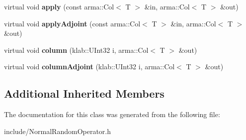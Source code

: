 \begin{DoxyCompactItemize}
\item 
virtual void {\bfseries apply} (const arma\+::\+Col$<$ T $>$ \&in, arma\+::\+Col$<$ T $>$ \&out)\hypertarget{classkl1p_1_1TNormalRandomOperator_ab66a9c633fc086840586c4dbb5121c8e}{}\label{classkl1p_1_1TNormalRandomOperator_ab66a9c633fc086840586c4dbb5121c8e}

\item 
virtual void {\bfseries apply\+Adjoint} (const arma\+::\+Col$<$ T $>$ \&in, arma\+::\+Col$<$ T $>$ \&out)\hypertarget{classkl1p_1_1TNormalRandomOperator_aee2e31e5354c537a16796cf8aa6fceac}{}\label{classkl1p_1_1TNormalRandomOperator_aee2e31e5354c537a16796cf8aa6fceac}

\item 
virtual void {\bfseries column} (klab\+::\+U\+Int32 i, arma\+::\+Col$<$ T $>$ \&out)\hypertarget{classkl1p_1_1TNormalRandomOperator_a6541575d385b936a024816b602c78e20}{}\label{classkl1p_1_1TNormalRandomOperator_a6541575d385b936a024816b602c78e20}

\item 
virtual void {\bfseries column\+Adjoint} (klab\+::\+U\+Int32 i, arma\+::\+Col$<$ T $>$ \&out)\hypertarget{classkl1p_1_1TNormalRandomOperator_ad9a3bd3ae2676acb2a50fc129fdce157}{}\label{classkl1p_1_1TNormalRandomOperator_ad9a3bd3ae2676acb2a50fc129fdce157}

\end{DoxyCompactItemize}
\subsection*{Additional Inherited Members}


The documentation for this class was generated from the following file\+:\begin{DoxyCompactItemize}
\item 
include/Normal\+Random\+Operator.\+h\end{DoxyCompactItemize}
